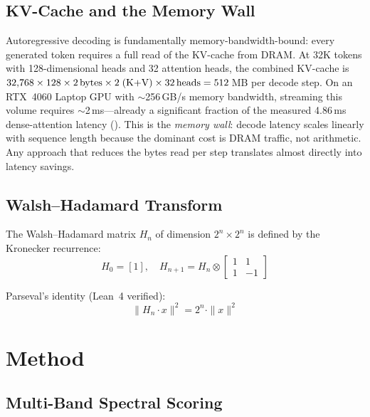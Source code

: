 \documentclass[conference]{IEEEtran}
\begin{document}
\subsection{KV-Cache and the Memory Wall}

Autoregressive decoding is fundamentally memory-bandwidth-bound: every
generated token requires a full read of the KV-cache from DRAM.
At 32K tokens with 128-dimensional heads and 32 attention heads, the
combined KV-cache is $32{,}768 \times 128 \times 2\text{\,bytes} \times 2
\;(\text{K+V}) \times 32\text{\,heads} = 512$\,MB per decode step.
On an RTX~4060 Laptop GPU with $\sim$256\,GB/s memory bandwidth,
streaming this volume requires $\sim$2\,ms---already a significant
fraction of the measured 4.86\,ms dense-attention latency
(). This is the \textit{memory wall}: decode
latency scales linearly with sequence length because the dominant cost
is DRAM traffic, not arithmetic. Any approach that reduces the bytes
read per step translates almost directly into latency savings.

\subsection{Walsh--Hadamard Transform}

The Walsh--Hadamard matrix $H_n$ of dimension $2^n \times 2^n$ is
defined by the Kronecker recurrence:
\begin{equation}
H_0 = [1], \quad H_{n+1} = H_n \otimes \begin{bmatrix} 1 & 1 \\ 1 & -1 \end{bmatrix}
\end{equation}

Parseval's identity (Lean~4 verified):
\begin{equation}\label{eq:parseval}
\|H_n \cdot x\|^2 = 2^n \cdot \|x\|^2
\end{equation}


\section{Method}\label{sec:method}

\subsection{Multi-Band Spectral Scoring}\label{sec:multiband}
\end{document}
